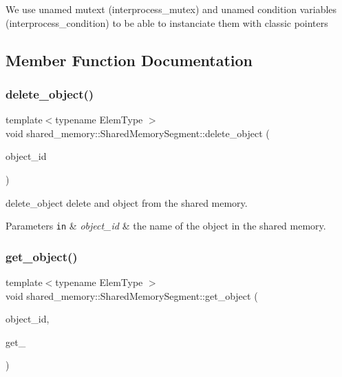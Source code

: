 We use unamed mutext (interprocess\+\_\+mutex) and unamed condition variables (interprocess\+\_\+condition) to be able to instanciate them with classic pointers 

\subsection{Member Function Documentation}
\mbox{\label{classshared__memory_1_1SharedMemorySegment_abc658e54589c81e89b147f0b3fbd67b8}} 
\subsubsection{\texorpdfstring{delete\+\_\+object()}{delete\_object()}}
{\footnotesize\ttfamily template$<$typename Elem\+Type $>$ \\
void shared\+\_\+memory\+::\+Shared\+Memory\+Segment\+::delete\+\_\+object (\begin{DoxyParamCaption}\item[{const std\+::string \&}]{object\+\_\+id }\end{DoxyParamCaption})}



delete\+\_\+object delete and object from the shared memory. 


\begin{DoxyParams}[1]{Parameters}
\mbox{\tt in}  & {\em object\+\_\+id} & the name of the object in the shared memory. \\
\hline
\end{DoxyParams}
\mbox{\label{classshared__memory_1_1SharedMemorySegment_ad73b5160f713c9a78e67c4b8590d8729}} 
\subsubsection{\texorpdfstring{get\+\_\+object()}{get\_object()}\hspace{0.1cm}{\footnotesize\ttfamily [1/2]}}
{\footnotesize\ttfamily template$<$typename Elem\+Type $>$ \\
void shared\+\_\+memory\+::\+Shared\+Memory\+Segment\+::get\+\_\+object (\begin{DoxyParamCaption}\item[{const std\+::string \&}]{object\+\_\+id,  }\item[{std\+::pair$<$ Elem\+Type $\ast$, std\+::size\+\_\+t $>$ \&}]{get\+\_\+ }\end{DoxyParamCaption})}



